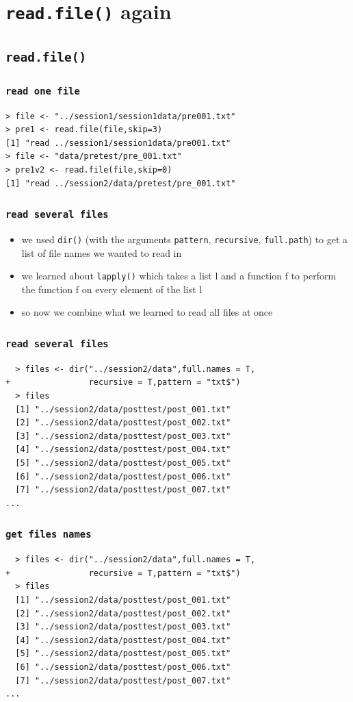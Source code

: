 \documentclass[xcolor={table},c]{beamer}
\begin{document}
\section{\texttt{read.file()} again}
\subsection{\texttt{read.file()}}
\begin{frame}[fragile]\frametitle{\texttt{read one file}}
\begin{verbatim}
> file <- "../session1/session1data/pre001.txt"
> pre1 <- read.file(file,skip=3)
[1] "read ../session1/session1data/pre001.txt"
> file <- "data/pretest/pre_001.txt"
> pre1v2 <- read.file(file,skip=0)
[1] "read ../session2/data/pretest/pre_001.txt"
\end{verbatim}
\end{frame}


\begin{frame}[fragile]\frametitle{\texttt{read several files}}
  \begin{itemize}
  \item we used \texttt{dir()} (with the arguments \texttt{pattern}, \texttt{recursive}, \texttt{full.path}) to get a list of file names we wanted to read in 
  \item we learned about \texttt{lapply()} which takes a list l and a function f to perform the function f on every element of the list l
  \item so now we combine what we learned to read all files at once
  \end{itemize}
\end{frame}


\begin{frame}[fragile]\frametitle{\texttt{read several files}}
\begin{verbatim}
  > files <- dir("../session2/data",full.names = T, 
+                recursive = T,pattern = "txt$")
  > files
  [1] "../session2/data/posttest/post_001.txt"   
  [2] "../session2/data/posttest/post_002.txt"   
  [3] "../session2/data/posttest/post_003.txt"   
  [4] "../session2/data/posttest/post_004.txt"   
  [5] "../session2/data/posttest/post_005.txt"   
  [6] "../session2/data/posttest/post_006.txt"   
  [7] "../session2/data/posttest/post_007.txt"   
...
\end{verbatim}
\end{frame}


\begin{frame}[fragile]\frametitle{\texttt{get files names}}
\begin{verbatim}
  > files <- dir("../session2/data",full.names = T, 
+                recursive = T,pattern = "txt$")
  > files
  [1] "../session2/data/posttest/post_001.txt"   
  [2] "../session2/data/posttest/post_002.txt"   
  [3] "../session2/data/posttest/post_003.txt"   
  [4] "../session2/data/posttest/post_004.txt"   
  [5] "../session2/data/posttest/post_005.txt"   
  [6] "../session2/data/posttest/post_006.txt"   
  [7] "../session2/data/posttest/post_007.txt"   
...
\end{verbatim}
\end{frame}
\end{document}
